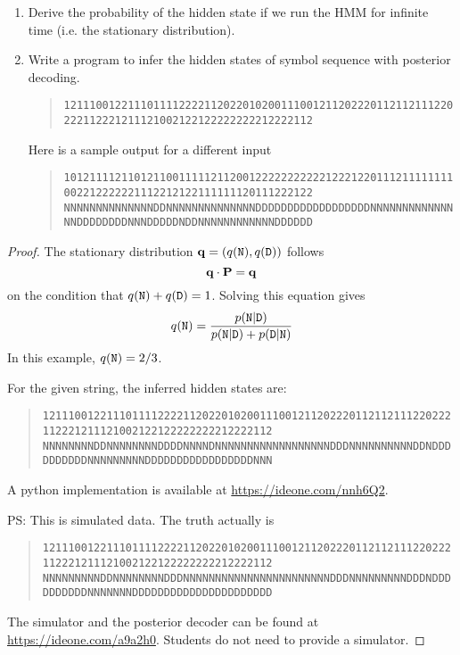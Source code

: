 \documentclass{article}[10pt]
\theoremstyle{definition}\newtheorem{question}{Question}
\begin{document}
\begin{enumerate}
\item Derive the probability of the hidden state if we run the HMM for infinite
time (i.e. the stationary distribution).
\item Write a program to infer the hidden states of symbol sequence with posterior decoding. 
\begin{quote}
\footnotesize\tt 1211100122111011112222112022010200111001211202220112112111220222112221211121002122122222222212222112\\
\end{quote}

Here is a sample output for a different input
\begin{quote}
\footnotesize\tt 1012111121101211001111121120012222222222212221220111211111111002212222221112212122111111120111222122
\footnotesize\tt NNNNNNNNNNNNNNDDNNNNNNNNNNNNNNDDDDDDDDDDDDDDDDDDNNNNNNNNNNNNNNNDDDDDDDDNNNDDDDDNDDNNNNNNNNNNNNDDDDDD
\end{quote}
\end{enumerate}

\begin{proof}
The stationary distribution ${\bf q}=(q({\tt N}),q({\tt D}))$ follows
$$
{\bf q}\cdot{\bf P}={\bf q}
$$
on the condition that $q({\tt N})+q({\tt D})=1$. Solving this equation gives
$$
q({\tt N})=\frac{p({\tt N}|{\tt D})}{p({\tt N}|{\tt D}) + p({\tt D}|{\tt N})}
$$
In this example, $q({\tt N})=2/3$.

For the given string, the inferred hidden states are:
\begin{quote}
\footnotesize\tt 1211100122111011112222112022010200111001211202220112112111220222112221211121002122122222222212222112\\
\footnotesize\tt NNNNNNNNDDNNNNNNNNDDDDNNNNDNNNNNNNNNNNNNNNNNNDDDNNNNNNNNNNDDNDDDDDDDDDDNNNNNNNNNDDDDDDDDDDDDDDDDDNNN
\end{quote}
A python implementation is available at \url{https://ideone.com/nnh6Q2}.

\begin{flushleft}
PS: This is simulated data. The truth actually is
\end{flushleft}
\begin{quote}
\footnotesize\tt 1211100122111011112222112022010200111001211202220112112111220222112221211121002122122222222212222112\\
\footnotesize\tt NNNNNNNNNDDNNNNNNNNDDDNNNNNNNNNNNNNNNNNNNNNNNDDDNNNNNNNNNDDDNDDDDDDDDDDNNNNNNNDDDDDDDDDDDDDDDDDDDDDD
\end{quote}

The simulator and the posterior decoder can be found at
\url{https://ideone.com/a9a2h0}. Students do not
need to provide a simulator.

\end{proof}
\end{document}
